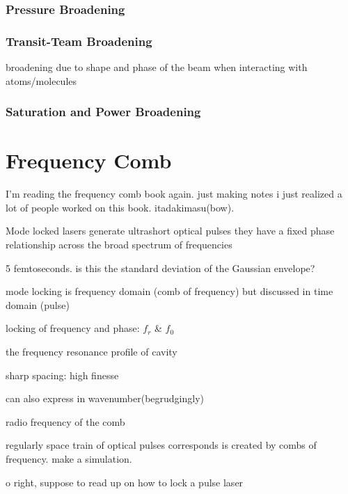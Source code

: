 \documentclass[11pt,a4paper]{book}
\begin{document}
\subsection{Pressure Broadening}
\subsection{Transit-Team Broadening}
broadening due to shape and phase of the beam when interacting with atoms/molecules

\subsection{Saturation and Power Broadening}

\chapter{Frequency Comb}
I'm reading the frequency comb book again. just making notes
i just realized a lot of people worked on this book. itadakimasu(bow).

Mode locked lasers generate ultrashort optical pulses they have a fixed phase relationship across the broad spectrum of frequencies

5 femtoseconds. is this the standard deviation of the Gaussian envelope?

mode locking is frequency domain (comb of frequency) but discussed in time domain (pulse)

locking of frequency and phase: $f_r$ \& $f_0$

the frequency resonance profile of cavity

sharp spacing: high finesse

can also express in wavenumber(begrudgingly)

radio frequency of the comb

regularly space train of optical pulses corresponds is created by combs of frequency. make a simulation.

o right, suppose to read up on how to lock a pulse laser
\end{document}
